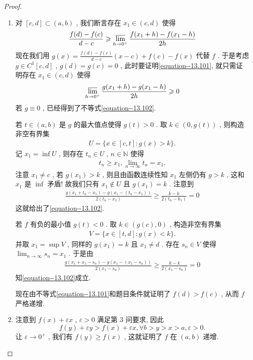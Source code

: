 \documentclass[../../main.tex]{subfiles}
\begin{document}
\begin{proof}
\begin{enumerate}
\item 对 \([c, d] \subset (a, b)\) , 我们断言存在 \(x_1 \in (c, d)\) 使得
\begin{align}
\frac{f(d) - f(c)}{d - c} \geqslant  \varlimsup_{h \to 0^+} \frac{f(x_1 + h) - f(x_1 - h)}{2h} \label{equation--13.101}
\end{align}
现在我们用 \(g(x) = \frac{f(d) - f(c)}{d - c}(x - c) + f(c) - f(x)\) 代替 \(f\) . 于是考虑 \(g \in C^1[c, d]\) , \(g(d) = g(c) = 0\) , 此时要证明\eqref{equation--13.101}, 就只需证明存在 \(x_1 \in (c, d)\) 使得
\begin{align}
\varlimsup_{h \to 0^+} \frac{g(x_1 + h) - g(x_1 - h)}{2h} \geqslant  0 \label{equation--13.102}
\end{align}
若 \(g \equiv 0\) , 已经得到了不等式\eqref{equation--13.102}.

若 \(t \in (a, b)\) 是 \(g\) 的最大值点使得 \(g(t) > 0\) . 取 \(k \in (0, g(t))\) , 则构造非空有界集
\begin{align*}
U = \{x \in [c, t] : g(x) > k\}.
\end{align*}
记 \(x_1 = \inf U\) , 则存在 \(t_n \in U\) , \(n \in \mathbb{N}\) 使得
\begin{align*}
t_n \geqslant  x_1 , \lim_{n \to \infty} t_n = x_1.
\end{align*}
注意 \(x_1 \neq c\) , 若 \(g(x_1) > k\) , 则且由函数连续性知 \(x_1\) 左侧仍有 \(g > k\) , 这和 \(x_1\) 是 \(\inf\) 矛盾! 故我们只有 \(x_1 \notin U\) 且 \(g(x_1) = k\) . 注意到
\begin{align*}
\frac{g(x_1 + t_n - x_1) - g(x_1 - (t_n - x_1))}{2(t_n - x_1)} \geqslant  \frac{k - k}{2(t_n - k_1)} = 0
\end{align*}
这就给出了\eqref{equation--13.102}.

若 \(f\) 有负的最小值 \(g(t) < 0\) . 取 \(k \in (g(c), 0)\) , 构造非空有界集
\begin{align*}
V = \{x \in [t, d] : g(x) < k\}.
\end{align*}
并取 \(x_1 = \sup V\) , 同样的 \(g(x_1) = k\) 且 \(x_1 \neq d\) . 存在 \(s_n \in V\) 使得 \(\lim_{n \to \infty} s_n = x_1\) . 于是由
\begin{align*}
\frac{g(x_1 + x_1 - s_n) - g(x_1 - (x_1 - s_n))}{2(x_1 - s_n)} \geqslant  \frac{k - k}{2(x_1 - s_n)} = 0
\end{align*}
知\eqref{equation--13.102}成立.

现在由不等式\eqref{equation--13.101}和题目条件就证明了 \(f(d) > f(c)\) , 从而 \(f\) 严格递增.

\item 注意到 \(f(x) + \varepsilon x\) , \(\varepsilon > 0\) 满足第 3 问要求, 因此
\[f(y) + \varepsilon y > f(x) + \varepsilon x ,\forall b > y > x > a , \varepsilon > 0.\]
让 \(\varepsilon \to 0^+\) , 我们有 \(f(y) \geqslant  f(x)\) , 这就证明了 \(f\) 在 \((a, b)\) 递增. 
\end{enumerate}

\end{proof}
\end{document}
